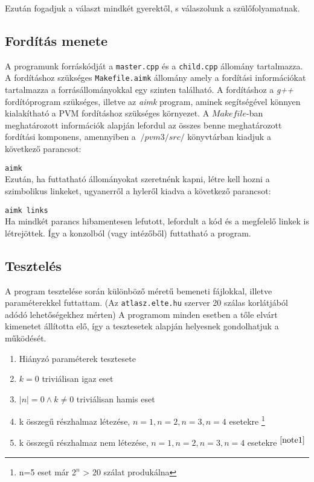 \documentclass[12pt]{article}
\begin{document}
Ezután fogadjuk a választ mindkét gyerektől, s válaszolunk a szülőfolyamatnak.
    
\subsection{Fordítás menete}

A programunk forráskódját a \verb|master.cpp| és a \verb|child.cpp| állomány tartalmazza. A fordításhoz szükséges \verb|Makefile.aimk| állomány amely a fordítási információkat tartalmazza a forrásállományokkal egy szinten található.
A fordításhoz a \textit{g++} fordítóprogram szükséges, illetve az \textit{aimk} program, aminek segítségével könnyen kialakítható a PVM fordításhoz szükséges környezet. A $Makefile$-ban meghatározott információk alapján lefordul az összes benne meghatározott fordítási komponens, amennyiben a $~/pvm3/src/$ könyvtárban kiadjuk a következő parancsot:

\verb|aimk| \\
Ezután, ha futtatható állományokat szeretnénk kapni, létre kell hozni a szimbolikus linkeket, ugyanerről a hyleről kiadva a következő parancsot:

\verb|aimk links|\\
Ha mindkét parancs hibamentesen lefutott, lefordult a kód és a megfelelő linkek is létrejöttek. Így a konzolból (vagy intézőből) futtatható a program.

\subsection{Tesztelés}

A program tesztelése során különböző méretű bemeneti fájlokkal, illetve paraméterekkel futtattam. (Az \verb|atlasz.elte.hu| szerver 20 szálas korlátjából adódó lehetőségekhez mérten)
A programom minden esetben a tőle elvárt kimenetet állította elő, így a tesztesetek alapján helyesnek gondolhatjuk a működését.

\begin{enumerate}
    \item Hiányzó paraméterek tesztesete
    \item $k = 0$ triviálisan igaz eset
    \item $|n| = 0 \wedge k \neq 0$ triviálisan hamis eset
    \item k összegű részhalmaz létezése, $n=1, n=2, n=3, n=4$ esetekre \footnote{ \label{note1} n=5 eset már 2$^n$ > 20 szálat produkálna}    \item k összegű részhalmaz nem létezése, $n=1, n=2, n=3, n=4$ esetekre $^{\ref{note1}}$
\end{enumerate}
\end{document}
